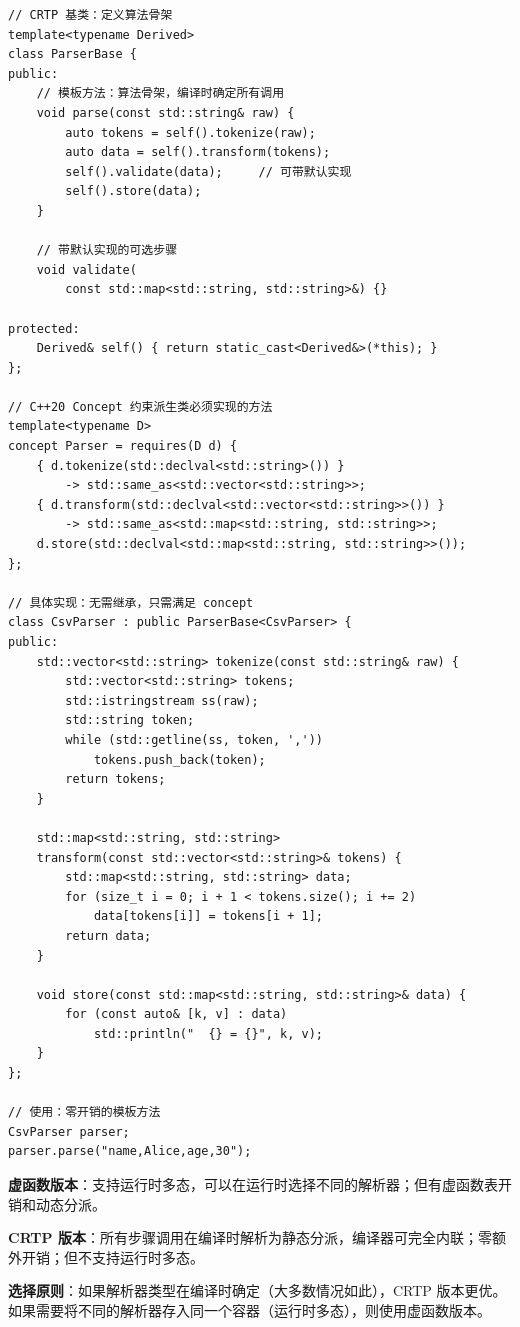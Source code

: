 \documentclass[12pt,a4paper,fontset=fandol]{ctexbook}
\begin{document}
\begin{lstlisting}[style=cppstyle, caption={CRTP 模板方法 --- 编译时算法骨架}]
// CRTP 基类：定义算法骨架
template<typename Derived>
class ParserBase {
public:
    // 模板方法：算法骨架，编译时确定所有调用
    void parse(const std::string& raw) {
        auto tokens = self().tokenize(raw);
        auto data = self().transform(tokens);
        self().validate(data);     // 可带默认实现
        self().store(data);
    }

    // 带默认实现的可选步骤
    void validate(
        const std::map<std::string, std::string>&) {}

protected:
    Derived& self() { return static_cast<Derived&>(*this); }
};

// C++20 Concept 约束派生类必须实现的方法
template<typename D>
concept Parser = requires(D d) {
    { d.tokenize(std::declval<std::string>()) }
        -> std::same_as<std::vector<std::string>>;
    { d.transform(std::declval<std::vector<std::string>>()) }
        -> std::same_as<std::map<std::string, std::string>>;
    d.store(std::declval<std::map<std::string, std::string>>());
};

// 具体实现：无需继承，只需满足 concept
class CsvParser : public ParserBase<CsvParser> {
public:
    std::vector<std::string> tokenize(const std::string& raw) {
        std::vector<std::string> tokens;
        std::istringstream ss(raw);
        std::string token;
        while (std::getline(ss, token, ','))
            tokens.push_back(token);
        return tokens;
    }

    std::map<std::string, std::string>
    transform(const std::vector<std::string>& tokens) {
        std::map<std::string, std::string> data;
        for (size_t i = 0; i + 1 < tokens.size(); i += 2)
            data[tokens[i]] = tokens[i + 1];
        return data;
    }

    void store(const std::map<std::string, std::string>& data) {
        for (const auto& [k, v] : data)
            std::println("  {} = {}", k, v);
    }
};

// 使用：零开销的模板方法
CsvParser parser;
parser.parse("name,Alice,age,30");
\end{lstlisting}

\begin{compare}[title={运行时 vs 编译时模板方法}]
\textbf{虚函数版本}：支持运行时多态，可以在运行时选择不同的解析器；但有虚函数表开销和动态分派。

\textbf{CRTP 版本}：所有步骤调用在编译时解析为静态分派，编译器可完全内联；零额外开销；但不支持运行时多态。

\textbf{选择原则}：如果解析器类型在编译时确定（大多数情况如此），CRTP 版本更优。如果需要将不同的解析器存入同一个容器（运行时多态），则使用虚函数版本。
\end{compare}
\end{document}
